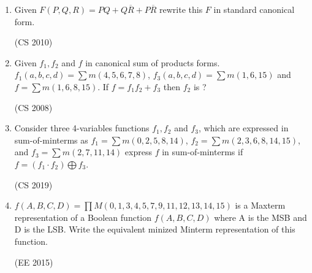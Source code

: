 \documentclass{article}
\begin{document}
\begin{enumerate}
    \item Given $F(P,Q,R)= PQ + Q\overline{R}+P\overline{R}$ 
   rewrite this $F$ in standard canonical form.
   \begin{flushright}
      (CS 2010)
    \end{flushright}
    \item Given $f_1, f_2$ and $f$ in canonical sum of products forms. $f_1(a,b,c,d)= \sum m(4,5,6,7,8)$, $f_3(a,b,c,d)= \sum m(1,6,15)$ and $f= \sum m(1,6,8,15)$. If $f=f_1f_2+f_3$ then $f_2$ is ?
     \begin{flushright}
      (CS 2008)
    \end{flushright}
    \item Consider three 4-variables functions $f_1, f_2$ and $f_3$, which are expressed in sum-of-minterms as $f_1 = \sum m(0,2,5,8,14)$, $f_2 = \sum m(2,3,6,8,14,15)$, and $f_3 = \sum m(2,7,11,14)$ express $f$ in sum-of-minterms if $f=(f_1\cdot f_2 )\bigoplus f_3$.
    \begin{flushright}
      (CS 2019)
    \end{flushright}
    \item $f(A,B,C,D) = \prod M(0,1,3,4,5,7,9,11,12,13,14,15)$ is a Maxterm representation of a Boolean function $f(A,B,C,D)$ where A is the MSB and D is the LSB. Write the equivalent minized Minterm representation of this function.\begin{flushright}
      (EE 2015)
    \end{flushright}
\end{enumerate}
\end{document}

